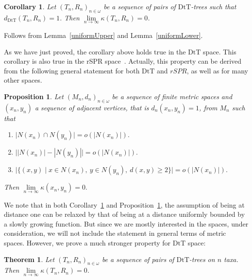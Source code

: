 \documentclass{amsart}
\newtheorem{proposition}[lemma]{Proposition}
\newtheorem{corollary}[lemma]{Corollary}
\newtheorem{theorem}[lemma]{Theorem}
\newcommand{\dts}{\mathrm{DtT}}
\begin{document}
\begin{corollary}\label{flatInLimDTS}
Let $(T_n,R_n)_{n\in\omega}$ be a sequence of pairs of $\dts$-trees such that
$d_{\dts}(T_n,R_n) = 1$. Then $\lim\limits_{n \to \infty}\kappa(T_n,R_n) = 0$.
\end{corollary}

\proof
Follows from Lemma~\ref{uniformUpper} and Lemma~\ref{uniformLower}.
\endproof

As we have just proved, the corollary above holds true in the $\dts$ space. 
This corollary is also true in the rSPR space~\cite{Whidden2015-es}.
Actually, this property can be derived from the following general statement 
for both $\dts$ and $rSPR$, as well as for many other spaces. 

\begin{proposition}\label{flatInLimGen}
Let $(M_n,d_n)_{n \in \omega}$ be a sequence of finite metric spaces and 
$(x_n, y_n)$ a sequence of adjacent vertices, that is $d_n(x_n,y_n) = 1$,
from $M_n$ such that
\begin{enumerate}[(1)]
\item $\big|N(x_n) \cap N(y_n)\big| = o(|N(x_n)|).$ 
\item $\big||N(x_n)| - |N(y_n)|\big| = o(|N(x_n)|).$ 
\item $\big|\{(x,y) \mid x \in N(x_n),~ y \in N(y_n),~ d(x, y) \geq 2\}\big| 
= o(|N(x_n)|).$
\end{enumerate}

Then $\lim\limits_{n \to \infty} \kappa(x_n, y_n) = 0.$
\end{proposition}

\proof

\endproof

We note that in both Corollary~\ref{flatInLimDTS} and 
Proposition~\ref{flatInLimGen}, the assumption of being at distance one can be
relaxed by that of being at a distance uniformly bounded by a slowly growing 
function. 
But since we are mostly interested in the spaces, under consideration, we will
not include the statement in general terms of metric spaces. However, we prove a
much stronger property for $\dts$ space: 

\begin{theorem}
Let $(T_n,R_n)_{n\in\omega}$ be a sequence of pairs of $\dts$-trees on $n$ taxa.
Then $\lim\limits_{n \to \infty}\kappa(T_n,R_n) = 0$.
\end{theorem}

\proof
{}
\endproof
\end{document}
